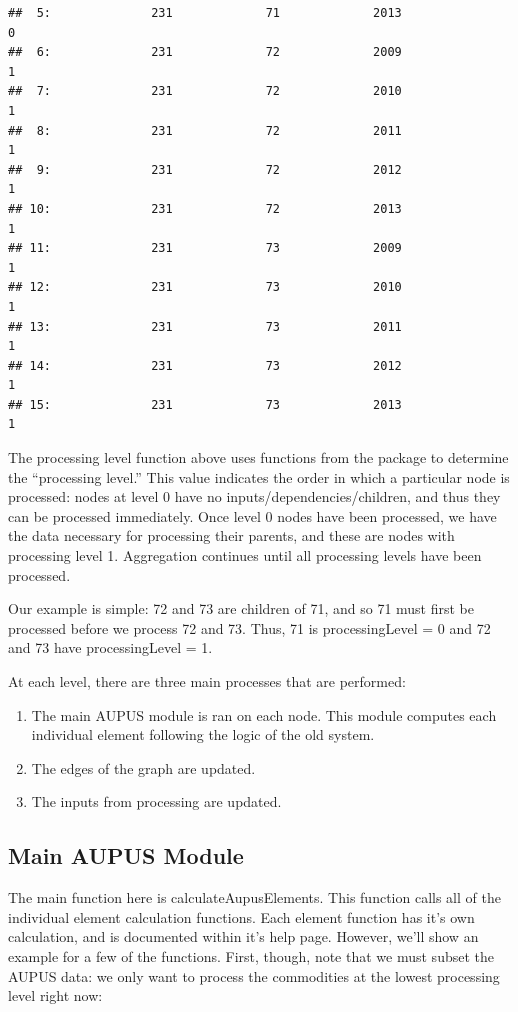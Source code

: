 \documentclass[nojss]{jss}
\begin{document}
\begin{knitrout}
\begin{kframe}
\begin{verbatim}
##  5:              231             71             2013               0
##  6:              231             72             2009               1
##  7:              231             72             2010               1
##  8:              231             72             2011               1
##  9:              231             72             2012               1
## 10:              231             72             2013               1
## 11:              231             73             2009               1
## 12:              231             73             2010               1
## 13:              231             73             2011               1
## 14:              231             73             2012               1
## 15:              231             73             2013               1
\end{verbatim}
\end{kframe}
\end{knitrout}

The processing level function above uses functions from the 
package to determine the ``processing level.''  This value indicates the order
in which a particular node is processed: nodes at level 0 have no
inputs/dependencies/children, and thus they can be processed immediately.  Once
level 0 nodes have been processed, we have the data necessary for processing
their parents, and these are nodes with processing level 1.  Aggregation
continues until all processing levels have been processed.

Our example is simple: 72 and 73 are children of 71, and so 71 must first be
processed before we process 72 and 73.  Thus, 71 is processingLevel = 0 and
72 and 73 have processingLevel = 1.

At each level, there are three main processes that are performed:
\begin{enumerate}
    \item The main AUPUS module is ran on each node.  This module computes each
    individual element following the logic of the old system.
    \item The edges of the graph are updated.
    \item The inputs from processing are updated.
\end{enumerate}

\subsection{Main AUPUS Module}

The main function here is calculateAupusElements.  This function calls all of
the individual element calculation functions.  Each element function has it's
own calculation, and is documented within it's help page.  However, we'll show
an example for a few of the functions.  First, though, note that we must subset
the AUPUS data: we only want to process the commodities at the lowest
processing level right now:
\end{document}
